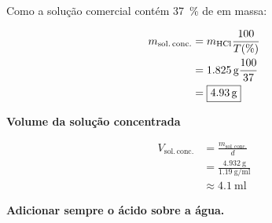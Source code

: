 \documentclass[a4paper,12pt]{article}
\newcommand{\subtitulo}[1]{%
  \par\medskip
  {\color{quadroazul}\bfseries\large #1}\par\smallskip
}
\begin{document}
Como a solução comercial contém \qty{37}{\percent} de  em massa:

\begin{align*}
  m_{\mathrm{sol.\,conc.}}
    &= m_{\ce{HCl}}\frac{100}{T(\%)} \\
    &= \qty{1.825}{\gram}\frac{100}{37} \\
    &= \boxed{\qty{4.93}{\gram}}
\end{align*}

\subtitulo{Volume da solução concentrada}

\begin{align*}
  V_{\mathrm{sol.\,conc.}}
    &= \frac{m_{\mathrm{sol.\,conc.}}}{d} \\
    &= \frac{\qty{4.932}{\gram}}
             {\qty{1.19}{\gram\per\milli\litre}} \\
    &\approx \boxed{\qty{4.1}{\milli\litre}}
\end{align*}

\vspace{0.5cm}

\begin{tcolorbox}[
  colback=quadrovermelho!6,
  colframe=quadrovermelho,
  boxrule=1pt,
  arc=2mm
]
\centering
{\color{quadrovermelho}\bfseries\Large Adicionar sempre o ácido sobre a água.}
\end{tcolorbox}
\end{document}

